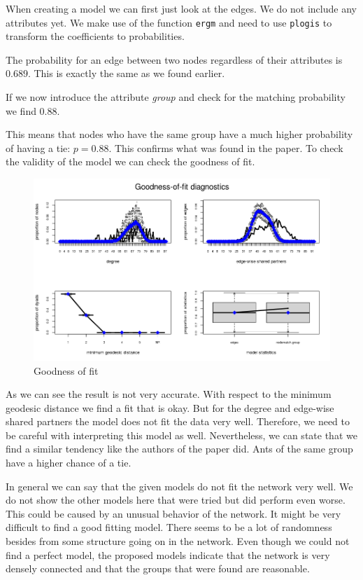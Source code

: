 \documentclass[
]{article}
\begin{document}
When creating a model we can first just look at the edges. We do not
include any attributes yet. We make use of the function \texttt{ergm}
and need to use \texttt{plogis} to transform the coefficients to
probabilities.

The probability for an edge between two nodes regardless of their
attributes is \(0.689\). This is exactly the same as we found earlier.

If we now introduce the attribute \emph{group} and check for the
matching probability we find \(0.88\).

This means that nodes who have the same group have a much higher
probability of having a tie: \(p=0.88\). This confirms what was found in
the paper. To check the validity of the model we can check the goodness
of fit.

\begin{figure}
\centering
\includegraphics{gof.png}
\caption{Goodness of fit}
\end{figure}

As we can see the result is not very accurate. With respect to the
minimum geodesic distance we find a fit that is okay. But for the degree
and edge-wise shared partners the model does not fit the data very well.
Therefore, we need to be careful with interpreting this model as well.
Nevertheless, we can state that we find a similar tendency like the
authors of the paper did. Ants of the same group have a higher chance of
a tie.

In general we can say that the given models do not fit the network very
well. We do not show the other models here that were tried but did
perform even worse. This could be caused by an unusual behavior of the
network. It might be very difficult to find a good fitting model. There
seems to be a lot of randomness besides from some structure going on in
the network. Even though we could not find a perfect model, the proposed
models indicate that the network is very densely connected and that the
groups that were found are reasonable.
\end{document}
